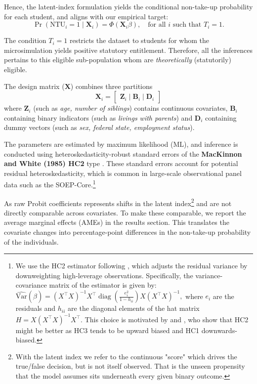 Hence, the latent-index formulation yields the conditional non-take-up probability for each student, and aligns with our empirical target:
\[
\Pr(\mathrm{NTU}_i = 1 \mid \mathbf{X}_i) = \Phi(\mathbf{X}_i \beta), \quad \text{for all } i \text{ such that } T_i = 1.
\]


The condition \( T_{i} = 1 \) restricts the dataset to students for whom the microsimulation yields positive statutory entitlement. Therefore, all the inferences pertains to this eligible sub-population whom are \textit{theoretically} (statutorily) eligible. 

The design matrix (\( \mathbf{X} \)) combines three partitions 
\begin{equation}
  \mathbf{X}_{i} = 
  \begin{bmatrix}
    \mathbf{Z}_{i} \mid \mathbf{B}_{i} \mid \mathbf{D}_{i}
  \end{bmatrix}
\end{equation}
where \( \mathbf{Z}_{i} \) (such as \textit{age, number of siblings}) contains continuous covariates, \( \mathbf{B}_{i} \) containing binary indicators (such as \textit{livings with parents})  and \( \mathbf{D}_{i} \) containing dummy vectors (such as \textit{sex, federal state, employment status}). 

The parameters are estimated by maximum likelihood (ML), and inference is conducted using heteroskedasticity-robust standard errors of the \textbf{MacKinnon and White (1985) HC2} type \citep{mackinnon_heteroskedasticity-consistent_1985}. These standard errors account for potential residual heteroskedasticity, which is common in large-scale observational panel data such as the SOEP-Core.\footnote{
We use the HC2 estimator following \citet{mackinnon_heteroskedasticity-consistent_1985}, which adjusts the residual variance by downweighting high-leverage observations. Specifically, the variance-covariance matrix of the estimator is given by:
\(
\widehat{\mathrm{Var}}(\hat{\beta}) = (X^\top X)^{-1} X^\top \operatorname{diag}\left( \frac{e_i^2}{1 - h_{ii}} \right) X (X^\top X)^{-1},
\)
where \( e_i \) are the residuals and \( h_{ii} \) are the diagonal elements of the hat matrix \( H = X(X^\top X)^{-1}X^\top \). This choice is motivated by \citet{chesher_hajek_1989} and \citet[Section 4]{chesher_finite-sample_1991}, who show that HC2 might be better as HC3 tends to be upward biased and HC1 downwards-biased.
}

As raw Probit coefficients represents shifts in the latent index\footnote{
With the latent index we refer to the continuous "score" which drives the true/false decision, but is not itself observed. That is the unseen propensity that the model assumes sits underneath every given binary outcome.
}
and are not directly comparable across covariates. To make these comparable, we report the average marginal effects (AMEs) in the results section. This translates the covariate changes into percentage-point differences in the non-take-up probability of the individuals.


